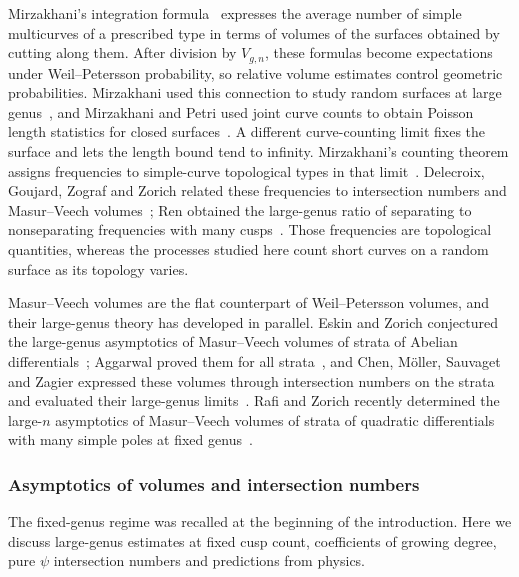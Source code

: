 Mirzakhani's integration formula~\cite{MirInv}
expresses the average number of simple multicurves of a prescribed
type in terms of volumes of the surfaces obtained by cutting along them.
After division by $V_{g,n}$, these formulas become expectations under
Weil--Petersson probability, so relative volume estimates control
geometric probabilities. Mirzakhani used this connection to study random
surfaces at large genus~\cite{Mir}, and Mirzakhani and Petri used joint
curve counts to obtain Poisson length statistics for closed
surfaces~\cite{MP}.
A different curve-counting limit fixes the surface and lets the length
bound tend to infinity. Mirzakhani's counting theorem assigns frequencies
to simple-curve topological types in that limit~\cite{MirCount}.
Delecroix, Goujard, Zograf and Zorich related these frequencies to
intersection numbers and Masur--Veech volumes~\cite{DGZZ}; Ren
obtained the large-genus ratio of separating to nonseparating frequencies
with many cusps~\cite{Ren}. Those frequencies are topological quantities,
whereas the processes studied here count short curves on a random
surface as its topology varies.

Masur--Veech volumes are the flat counterpart of Weil--Petersson
volumes, and their large-genus theory has developed in parallel.
Eskin and Zorich conjectured the large-genus asymptotics of
Masur--Veech volumes of strata of Abelian differentials~\cite{EZ};
Aggarwal proved them for all strata~\cite{AggAbelian}, and Chen,
M\"oller, Sauvaget and Zagier expressed these volumes through
intersection numbers on the strata and evaluated their large-genus
limits~\cite{CMSZ}. Rafi and Zorich recently determined the large-$n$
asymptotics of Masur--Veech volumes of strata of quadratic differentials
with many simple poles at fixed genus~\cite{RZ}.

\subsubsection{Asymptotics of volumes and intersection numbers}
The fixed-genus regime was recalled at the beginning of the
introduction. Here we discuss large-genus estimates at fixed cusp
count, coefficients of growing degree, pure $\psi$ intersection numbers
and predictions from physics.

